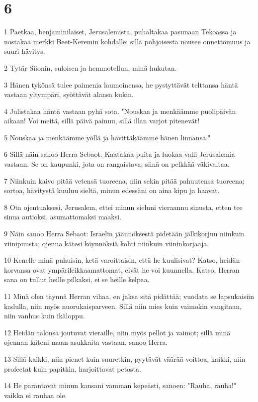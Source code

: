 \chapter{6}

\par 1 Paetkaa, benjaminilaiset, Jerusalemista, puhaltakaa pasunaan Tekoassa ja nostakaa merkki Beet-Keremin kohdalle; sillä pohjoisesta nousee onnettomuus ja suuri hävitys.
\par 2 Tytär Siionin, suloisen ja hemmotellun, minä hukutan.
\par 3 Hänen tykönsä tulee paimenia laumoinensa, he pystyttävät telttansa häntä vastaan yltympäri, syöttävät alansa kukin.
\par 4 Julistakaa häntä vastaan pyhä sota. "Nouskaa ja menkäämme puolipäivän aikaan! Voi meitä, sillä päivä painuu, sillä illan varjot pitenevät!
\par 5 Nouskaa ja menkäämme yöllä ja hävittäkäämme hänen linnansa."
\par 6 Sillä näin sanoo Herra Sebaot: Kaatakaa puita ja luokaa valli Jerusalemia vastaan. Se on kaupunki, jota on rangaistava; siinä on pelkkää väkivaltaa.
\par 7 Niinkuin kaivo pitää vetensä tuoreena, niin sekin pitää pahuutensa tuoreena; sortoa, hävitystä kuuluu sieltä, minun edessäni on aina kipu ja haavat.
\par 8 Ota ojentuaksesi, Jerusalem, ettei minun sieluni vieraannu sinusta, etten tee sinua autioksi, asumattomaksi maaksi.
\par 9 Näin sanoo Herra Sebaot: Israelin jäännöksestä pidetään jälkikorjuu niinkuin viinipuusta; ojenna kätesi köynnöksiä kohti niinkuin viininkorjaaja.
\par 10 Kenelle minä puhuisin, ketä varoittaisin, että he kuulisivat? Katso, heidän korvansa ovat ympärileikkaamattomat, eivät he voi kuunnella. Katso, Herran sana on tullut heille pilkaksi, ei se heille kelpaa.
\par 11 Minä olen täynnä Herran vihaa, en jaksa sitä pidättää; vuodata se lapsukaisiin kadulla, niin myös nuorukaisparveen. Sillä niin mies kuin vaimokin vangitaan, niin vanhus kuin ikäloppu.
\par 12 Heidän talonsa joutuvat vieraille, niin myös pellot ja vaimot; sillä minä ojennan käteni maan asukkaita vastaan, sanoo Herra.
\par 13 Sillä kaikki, niin pienet kuin suuretkin, pyytävät väärää voittoa, kaikki, niin profeetat kuin papitkin, harjoittavat petosta.
\par 14 He parantavat minun kansani vamman kepeästi, sanoen: "Rauha, rauha!" vaikka ei rauhaa ole.

